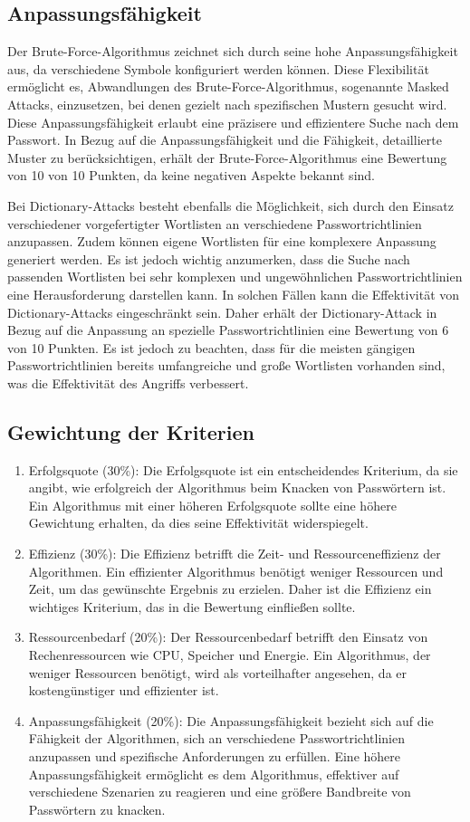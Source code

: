 \subsection{Anpassungsfähigkeit}
Der Brute-Force-Algorithmus zeichnet sich durch seine hohe Anpassungsfähigkeit aus, da verschiedene Symbole konfiguriert werden können. 
Diese Flexibilität ermöglicht es, Abwandlungen des Brute-Force-Algorithmus, sogenannte Masked Attacks, einzusetzen, bei denen gezielt nach spezifischen Mustern gesucht wird. 
Diese Anpassungsfähigkeit erlaubt eine präzisere und effizientere Suche nach dem Passwort. 
In Bezug auf die Anpassungsfähigkeit und die Fähigkeit, detaillierte Muster zu berücksichtigen, erhält der Brute-Force-Algorithmus eine Bewertung von 10 von 10 Punkten, da keine negativen Aspekte bekannt sind.

Bei Dictionary-Attacks besteht ebenfalls die Möglichkeit, sich durch den Einsatz verschiedener vorgefertigter Wortlisten an verschiedene Passwortrichtlinien anzupassen. 
Zudem können eigene Wortlisten für eine komplexere Anpassung generiert werden. 
Es ist jedoch wichtig anzumerken, dass die Suche nach passenden Wortlisten bei sehr komplexen und ungewöhnlichen Passwortrichtlinien eine Herausforderung darstellen kann. 
In solchen Fällen kann die Effektivität von Dictionary-Attacks eingeschränkt sein. 
Daher erhält der Dictionary-Attack in Bezug auf die Anpassung an spezielle Passwortrichtlinien eine Bewertung von 6 von 10 Punkten. 
Es ist jedoch zu beachten, dass für die meisten gängigen Passwortrichtlinien bereits umfangreiche und große Wortlisten vorhanden sind, was die Effektivität des Angriffs verbessert.
\subsection{Gewichtung der Kriterien}
\begin{enumerate}
    \item Erfolgsquote (30\%): Die Erfolgsquote ist ein entscheidendes Kriterium, da sie angibt, wie erfolgreich der Algorithmus beim Knacken von Passwörtern ist. Ein Algorithmus mit einer höheren Erfolgsquote sollte eine höhere Gewichtung erhalten, da dies seine Effektivität widerspiegelt.
    \item Effizienz (30\%): Die Effizienz betrifft die Zeit- und Ressourceneffizienz der Algorithmen. Ein effizienter Algorithmus benötigt weniger Ressourcen und Zeit, um das gewünschte Ergebnis zu erzielen. Daher ist die Effizienz ein wichtiges Kriterium, das in die Bewertung einfließen sollte.
    \item Ressourcenbedarf (20\%): Der Ressourcenbedarf betrifft den Einsatz von Rechenressourcen wie CPU, Speicher und Energie. Ein Algorithmus, der weniger Ressourcen benötigt, wird als vorteilhafter angesehen, da er kostengünstiger und effizienter ist.
    \item Anpassungsfähigkeit (20\%): Die Anpassungsfähigkeit bezieht sich auf die Fähigkeit der Algorithmen, sich an verschiedene Passwortrichtlinien anzupassen und spezifische Anforderungen zu erfüllen. Eine höhere Anpassungsfähigkeit ermöglicht es dem Algorithmus, effektiver auf verschiedene Szenarien zu reagieren und eine größere Bandbreite von Passwörtern zu knacken.
\end{enumerate}
